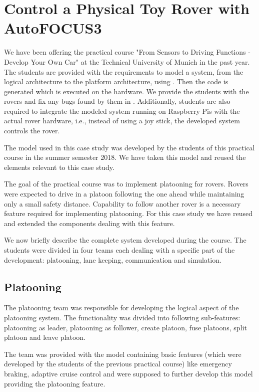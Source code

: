 \section{Control a Physical Toy Rover with AutoFOCUS3}
\label{sec:toy_rover_controller}

We have been offering the practical course "From Sensors to Driving Functions - Develop Your Own Car" at the Technical University of Munich in the past year. The students are provided with the requirements to model a system, from the logical architecture to the platform architecture, using \af. Then the code is generated which is executed on the hardware.  We provide the students with the rovers and fix any bugs found by them in \af. Additionally, students are also required to integrate the modeled system running on Raspberry Pis with the actual rover hardware, i.e., instead of using a joy stick, the developed system controls the rover.

The model used in this case study was developed by the students of this practical course in the summer semester 2018. We have taken this model and reused the elements relevant to this case study. 

The goal of the practical course was to implement platooning for rovers. Rovers were expected to drive in a platoon following the one ahead while maintaining only a small safety distance. Capability to follow another rover is a necessary feature required for implementing platooning. For this case study we have reused and extended the components dealing with this feature. 

We now briefly describe the complete system developed during the course. The students were divided in four teams each dealing with a specific part of the development: platooning, lane keeping, communication and simulation.

\subsection{Platooning}
The platooning team was responsible for developing the logical aspect of the platooning system. The functionality was divided into following sub-features: platooning as leader, platooning as follower, create platoon, fuse platoons, split platoon and leave platoon.

The team was provided with the model containing basic features (which were developed by the students of the previous practical course) like emergency braking, adaptive cruise control and were supposed to further develop this model providing the platooning feature.

